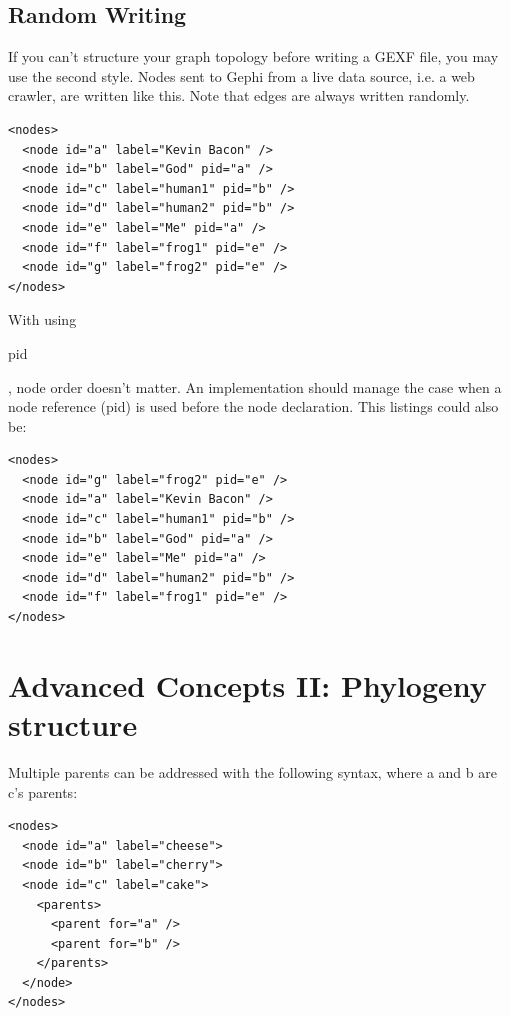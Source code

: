 \documentclass[a4paper,10pt]{article}
\begin{document}
\subsection{Random Writing}

If you can't structure your graph topology before writing a GEXF file, you may use the second style. Nodes sent to Gephi from a live data source, i.e. a web crawler, are written like this. Note that edges are always written randomly.

\lstset{ style=gexf }
\begin{lstlisting}[caption={Second way},label=hierarchy2]
<nodes>
  <node id="a" label="Kevin Bacon" />
  <node id="b" label="God" pid="a" />
  <node id="c" label="human1" pid="b" />
  <node id="d" label="human2" pid="b" />
  <node id="e" label="Me" pid="a" />
  <node id="f" label="frog1" pid="e" />
  <node id="g" label="frog2" pid="e" />
</nodes>
\end{lstlisting}

With using \begin{footnotesize}pid\end{footnotesize}, node order doesn't matter. An implementation should manage the case when a node reference (pid) is used before the node declaration. This listings could also be:

\lstset{ style=gexf }
\begin{lstlisting}[caption={Second way randomized},label=hierarchy22]
<nodes>
  <node id="g" label="frog2" pid="e" />
  <node id="a" label="Kevin Bacon" />
  <node id="c" label="human1" pid="b" />
  <node id="b" label="God" pid="a" />
  <node id="e" label="Me" pid="a" />
  <node id="d" label="human2" pid="b" />
  <node id="f" label="frog1" pid="e" />
</nodes>
\end{lstlisting}


\section{Advanced Concepts II: Phylogeny structure} \label{phylogeny}

Multiple parents can be addressed with the following syntax, where a and b are c's parents:
\lstset{ style=gexf }
\begin{lstlisting}[caption={Multiple parents},label=phylogeny1]
<nodes>
  <node id="a" label="cheese">
  <node id="b" label="cherry">
  <node id="c" label="cake">
    <parents>
      <parent for="a" />
      <parent for="b" />
    </parents>
  </node>
</nodes>
\end{lstlisting}
\end{document}
